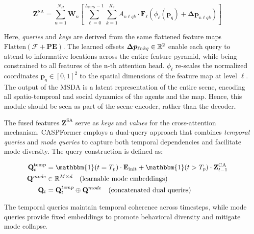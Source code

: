 \begin{description}[leftmargin=1em,itemsep=2pt]
\begin{description}[leftmargin=1em,itemsep=2pt]
\begin{equation}
\label{eq:msda_operation}
\mathbf{Z}^{\text{SA}} = \sum_{n=1}^{N_H} \mathbf{W}_{n} \left[\sum_{\ell=0}^{L_{\text{FPN}}-1} \sum_{k=1}^{K_s} A_{n\ell qk} \cdot \mathbf{F}_\ell(\phi_{\ell}(\mathbf{p}_q) + \boldsymbol{\Delta p}_{n\ell qk}) \right]
\end{equation}

Here, \emph{queries} and \emph{keys} are derived from the same flattened feature maps \(\text{Flatten}(\boldsymbol{\mathcal{F}} + \textbf{PE})\). The learned offsets \(\boldsymbol{\Delta p}_{\ell nkq} \in \mathbb{R}^2\) enable each query to attend to informative locations across the entire feature pyramid, while being constrained to all features of the n-th attention head. \( \phi_{\ell} \) re-scales the normalized coordinates \( \mathbf{p}_q \in [0,1]^2\) to the spatial dimensions of the feature map at level \(\ell\).\\
  The output of the MSDA is a latent representation of the entire scene, encoding all spatio-temproal and social dynamics of the agents and the map. Hence, this module should be seen as part of the scene-encoder, rather than the decoder.

\item[Recurrent Deformable Cross-Attention.] The fused features \(\mathbf{Z}^{\text{SA}}\) serve as \emph{keys} and \emph{values} for the cross-attention mechanism. CASPFormer employs a dual-query approach that combines \emph{temporal queries} and \emph{mode queries} to capture both temporal dependencies and facilitate mode diversity. The query construction is defined as:

\begin{equation}
\label{eq:dual_query_construction}
\begin{aligned}
\mathbf{Q}_t^{\text{temp}} &= \mathbbm{1}(t=T_p) \cdot \mathbf{E}_{\text{init}} + \mathbbm{1}(t>T_p) \cdot \mathbf{Z}^{\text{CA}}_{t-1} \\
\mathbf{Q}^{mode} &\in \R^{M \times d} \quad \text{(learnable mode embeddings)} \\
\mathbf{Q}_t &= \mathbf{Q}_t^{temp} \oplus \mathbf{Q}^{mode} \quad \text{(concatenated dual queries)}
\end{aligned}
\end{equation}

The temporal queries maintain temporal coherence across timesteps, while mode queries provide fixed embeddings to promote behavioral diversity and mitigate mode collapse.


\end{description}
\end{description}
